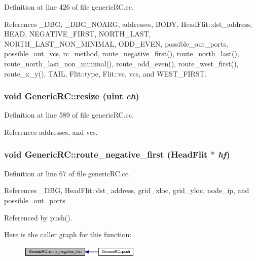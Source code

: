 Definition at line 426 of file genericRC.cc.

References \_\-DBG, \_\-DBG\_\-NOARG, addresses, BODY, HeadFlit::dst\_\-address, HEAD, NEGATIVE\_\-FIRST, NORTH\_\-LAST, NORTH\_\-LAST\_\-NON\_\-MINIMAL, ODD\_\-EVEN, possible\_\-out\_\-ports, possible\_\-out\_\-vcs, rc\_\-method, route\_\-negative\_\-first(), route\_\-north\_\-last(), route\_\-north\_\-last\_\-non\_\-minimal(), route\_\-odd\_\-even(), route\_\-west\_\-first(), route\_\-x\_\-y(), TAIL, Flit::type, Flit::vc, vcs, and WEST\_\-FIRST.
\subsubsection[{resize}]{\setlength{\rightskip}{0pt plus 5cm}void GenericRC::resize ({\bf uint} {\em ch})}\label{classGenericRC_d4814cc717b534b3e0968bdf6ff099e0}




Definition at line 589 of file genericRC.cc.

References addresses, and vcs.
\subsubsection[{route\_\-negative\_\-first}]{\setlength{\rightskip}{0pt plus 5cm}void GenericRC::route\_\-negative\_\-first ({\bf HeadFlit} $\ast$ {\em hf})\hspace{0.3cm}{\tt  [private]}}\label{classGenericRC_45b503a8ac6becaa1660d2197ff126b2}




Definition at line 67 of file genericRC.cc.

References \_\-DBG, HeadFlit::dst\_\-address, grid\_\-xloc, grid\_\-yloc, node\_\-ip, and possible\_\-out\_\-ports.

Referenced by push().

Here is the caller graph for this function:\nopagebreak
\begin{figure}[H]
\begin{center}
\leavevmode
\includegraphics[width=163pt]{classGenericRC_45b503a8ac6becaa1660d2197ff126b2_icgraph}
\end{center}
\end{figure}
